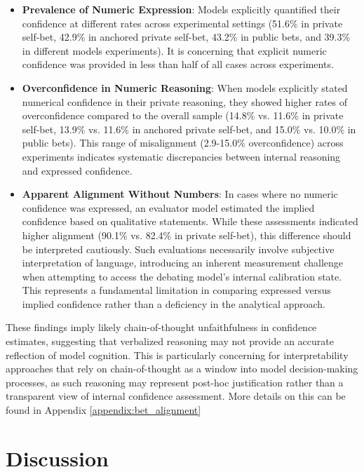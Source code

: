 \documentclass{article}
\begin{document}
\begin{itemize}
   \item \textbf{Prevalence of Numeric Expression}: Models explicitly quantified their confidence at different rates across experimental settings (51.6\% in private self-bet, 42.9\% in anchored private self-bet, 43.2\% in public bets, and 39.3\% in different models experiments). It is concerning that explicit numeric confidence was provided in less than half of all cases across experiments.

   \item \textbf{Overconfidence in Numeric Reasoning}: When models explicitly stated numerical confidence in their private reasoning, they showed higher rates of overconfidence compared to the overall sample (14.8\% vs. 11.6\% in private self-bet, 13.9\% vs. 11.6\% in anchored private self-bet, and 15.0\% vs. 10.0\% in public bets). This range of misalignment (2.9-15.0\% overconfidence) across experiments indicates systematic discrepancies between internal reasoning and expressed confidence.

   \item \textbf{Apparent Alignment Without Numbers}: In cases where no numeric confidence was expressed, an evaluator model estimated the implied confidence based on qualitative statements. While these assessments indicated higher alignment (90.1\% vs. 82.4\% in private self-bet), this difference should be interpreted cautiously. Such evaluations necessarily involve subjective interpretation of language, introducing an inherent measurement challenge when attempting to access the debating model's internal calibration state. This represents a fundamental limitation in comparing expressed versus implied confidence rather than a deficiency in the analytical approach.
\end{itemize}

These findings imply likely chain-of-thought unfaithfulness in confidence estimates, suggesting that verbalized reasoning may not provide an accurate reflection of model cognition. This is particularly concerning for interpretability approaches that rely on chain-of-thought as a window into model decision-making processes, as such reasoning may represent post-hoc justification rather than a transparent view of internal confidence assessment. More details on this can be found in Appendix \ref{appendix:bet_alignment}
\section{Discussion}
\label{sec:discussion}
\end{document}
